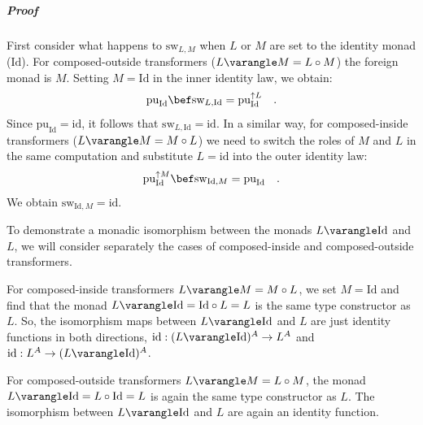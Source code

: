 \subparagraph{Proof}

First consider what happens to $\text{sw}_{L,M}$ when $L$ or $M$
are set to the identity monad ($\text{Id}$). For composed-outside
transformers ($L\varangle M=L\circ M$) the foreign monad is $M$.
Setting $M=\text{Id}$ in the inner identity law, we obtain: 
\[
\text{pu}_{\text{Id}}\bef\text{sw}_{L,\text{Id}}=\text{pu}_{\text{Id}}^{\uparrow L}\quad.
\]
Since $\text{pu}_{\text{Id}}=\text{id}$, it follows that $\text{sw}_{L,\text{Id}}=\text{id}$.
In a similar way, for composed-inside transformers ($L\varangle M=M\circ L$)
we need to switch the roles of $M$ and $L$ in the same computation
and substitute $L=\text{id}$ into the outer identity law:
\[
\text{pu}_{\text{Id}}^{\uparrow M}\bef\text{sw}_{\text{Id},M}=\text{pu}_{\text{Id}}\quad.
\]
We obtain $\text{sw}_{\text{Id},M}=\text{id}$.

To demonstrate a monadic isomorphism between the monads $L\varangle\text{Id}$
and $L$, we will consider separately the cases of composed-inside
and composed-outside transformers.

For composed-inside transformers $L\varangle M=M\circ L$, we set
$M=\text{Id}$ and find that the monad $L\varangle\text{Id}=\text{Id}\circ L=L$
is the same type constructor as $L$. So, the isomorphism maps between
$L\varangle\text{Id}$ and $L$ are just identity functions in both
directions, $\text{id}:(L\varangle\text{Id})^{A}\rightarrow L^{A}$
and $\text{id}:L^{A}\rightarrow(L\varangle\text{Id})^{A}$. 

For composed-outside transformers $L\varangle M=L\circ M$, the monad
$L\varangle\text{Id}=L\circ\text{Id}=L$ is again the same type constructor
as $L$. The isomorphism between $L\varangle\text{Id}$ and $L$ are
again an identity function.

